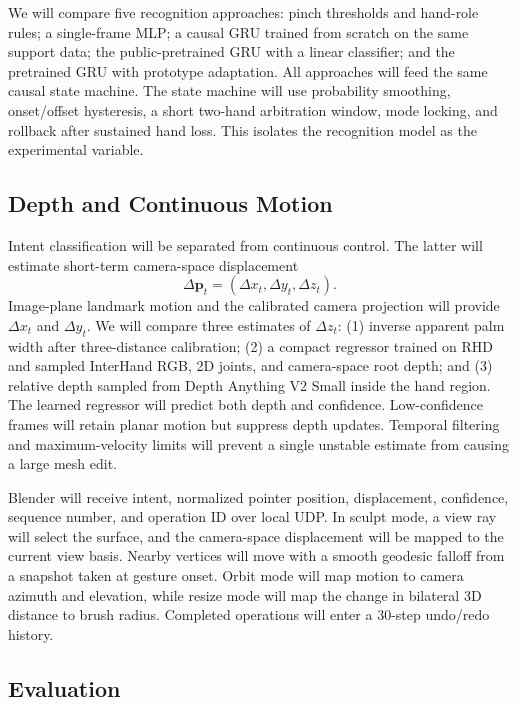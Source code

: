 \documentclass{article}
\begin{document}
We will compare five recognition approaches: pinch thresholds and hand-role
rules; a single-frame MLP; a causal GRU trained from scratch on the same support
data; the public-pretrained GRU with a linear classifier; and the pretrained
GRU with prototype adaptation. All approaches will feed the same causal state
machine. The state machine will use probability smoothing, onset/offset
hysteresis, a short two-hand arbitration window, mode locking, and rollback
after sustained hand loss. This isolates the recognition model as the
experimental variable.

\subsection{Depth and Continuous Motion}

Intent classification will be separated from continuous control. The latter
will estimate short-term camera-space displacement
\begin{equation}
  \Delta\mathbf{p}_t = (\Delta x_t,\Delta y_t,\Delta z_t).
\end{equation}
Image-plane landmark motion and the calibrated camera projection will provide
$\Delta x_t$ and $\Delta y_t$. We will compare three estimates of
$\Delta z_t$: (1) inverse apparent palm width after three-distance calibration;
(2) a compact regressor trained on RHD and sampled InterHand RGB, 2D joints,
and camera-space root depth; and (3) relative depth sampled from Depth Anything
V2 Small inside the hand region. The learned regressor will predict both depth
and confidence. Low-confidence frames will retain planar motion but suppress
depth updates. Temporal filtering and maximum-velocity limits will prevent a
single unstable estimate from causing a large mesh edit.

Blender will receive intent, normalized pointer position, displacement,
confidence, sequence number, and operation ID over local UDP. In sculpt mode,
a view ray will select the surface, and the camera-space displacement will be
mapped to the current view basis. Nearby vertices will move with a smooth
geodesic falloff from a snapshot taken at gesture onset. Orbit mode will map
motion to camera azimuth and elevation, while resize mode will map the change
in bilateral 3D distance to brush radius. Completed operations will enter a
30-step undo/redo history.

\subsection{Evaluation}
\end{document}
